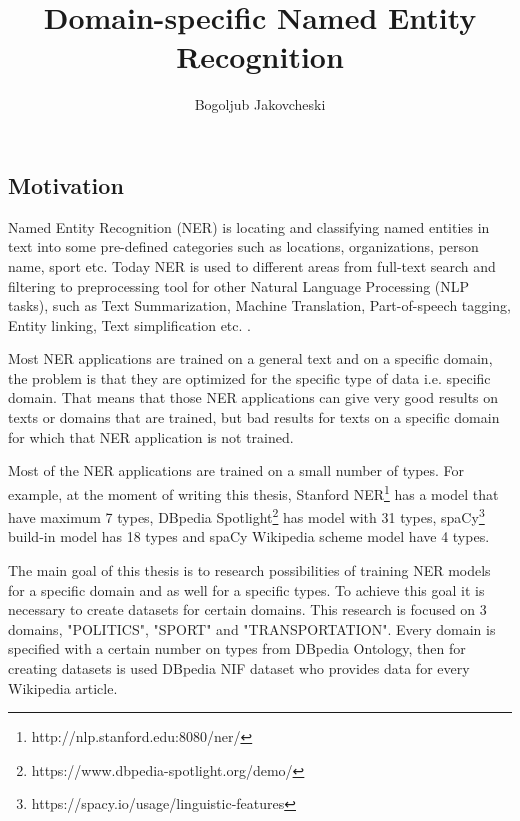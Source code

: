 \documentclass[thesis=M,english]{FITthesis}[2018/05/30]
\title{Domain-specific Named Entity Recognition}
\author{Bogoljub Jakovcheski} %
\begin{document}

\begin{introduction}

\section{Motivation}
    Named Entity Recognition (NER)\cite{wiki:NER} is locating and classifying named entities in text into some pre-defined categories such as locations, organizations, person name, sport etc. Today NER is used to different areas from full-text search and filtering to preprocessing tool for other Natural Language Processing (NLP tasks), such as Text Summarization, Machine Translation, Part-of-speech tagging, Entity linking, Text simplification etc. \cite{master:NER}.  	
		
    Most NER applications are trained on a general text and on a specific domain, the problem is that they are optimized for the specific type of data i.e. specific domain. That means that those NER applications can give very good results on texts or domains that are trained, but bad results for texts on a specific domain for which that NER application is not trained.
	  
    Most of the NER applications are trained on a small number of types. For example, at the moment of writing this thesis, Stanford NER\footnote{http://nlp.stanford.edu:8080/ner/} has a model that have maximum 7 types, DBpedia Spotlight\footnote{https://www.dbpedia-spotlight.org/demo/} has model with 31 types, spaCy\footnote{https://spacy.io/usage/linguistic-features} build-in model has 18 types and spaCy Wikipedia scheme model have 4 types.
	  
	The main goal of this thesis is to research possibilities of training NER models for a specific domain and as well for a specific types. To achieve this goal it is necessary to create datasets for certain domains. This research is focused on 3 domains, "POLITICS", "SPORT" and "TRANSPORTATION". Every domain is specified with a certain number on types from DBpedia Ontology, then for creating datasets is used DBpedia NIF dataset who provides data for every Wikipedia article.
	
	  
	  

\end{introduction}
\end{document}
